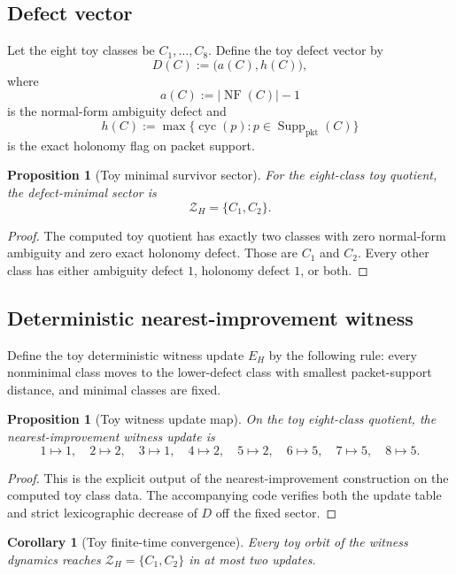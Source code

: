 \documentclass[11pt]{article}
\newtheorem{proposition}[theorem]{Proposition}
\newtheorem{corollary}[theorem]{Corollary}
\theoremstyle{remark}
\theoremstyle{plain}
\begin{document}
\subsection{Defect vector}

Let the eight toy classes be \(C_1,\dots,C_8\). Define the toy defect vector by
\[
D(C):=\bigl(a(C),h(C)\bigr),
\]
where
\[
a(C):=|\operatorname{NF}(C)|-1
\]
is the normal-form ambiguity defect and
\[
h(C):=\max\{\operatorname{cyc}(p): p\in \operatorname{Supp}_{\mathrm{pkt}}(C)\}
\]
is the exact holonomy flag on packet support.

\begin{proposition}[Toy minimal survivor sector]
\label{prop:toyz}
For the eight-class toy quotient, the defect-minimal sector is
\[
\mathcal Z_H=\{C_1,C_2\}.
\]
\end{proposition}

\begin{proof}
The computed toy quotient has exactly two classes with zero normal-form ambiguity and zero exact holonomy defect. Those are \(C_1\) and \(C_2\). Every other class has either ambiguity defect \(1\), holonomy defect \(1\), or both.
\end{proof}

\subsection{Deterministic nearest-improvement witness}

Define the toy deterministic witness update \(E_H\) by the following rule: every nonminimal class moves to the lower-defect class with smallest packet-support distance, and minimal classes are fixed.

\begin{proposition}[Toy witness update map]
\label{prop:toyupdate}
On the toy eight-class quotient, the nearest-improvement witness update is
\[
1\mapsto 1,\quad
2\mapsto 2,\quad
3\mapsto 1,\quad
4\mapsto 2,\quad
5\mapsto 2,\quad
6\mapsto 5,\quad
7\mapsto 5,\quad
8\mapsto 5.
\]
\end{proposition}

\begin{proof}
This is the explicit output of the nearest-improvement construction on the computed toy class data. The accompanying code verifies both the update table and strict lexicographic decrease of \(D\) off the fixed sector.
\end{proof}

\begin{corollary}[Toy finite-time convergence]
\label{cor:toyconv}
Every toy orbit of the witness dynamics reaches \(\mathcal Z_H=\{C_1,C_2\}\) in at most two updates.
\end{corollary}
\end{document}
